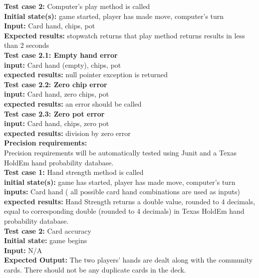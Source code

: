\documentclass[12pt]{article}
\begin{document}
	\noindent \textbf{Test case 2:} Computer’s play method is called\\
	\textbf{Initial state(s):} game started, player has made move, computer's turn\\
	\textbf{Input:} Card hand, chips, pot\\
	\textbf{Expected results:} stopwatch returns that play method returns results in less than 2 seconds\\

	\noindent \textbf{Test case 2.1: Empty hand error}\\
	\textbf{input:} Card hand (empty), chips, pot\\
	\textbf{expected results:} null pointer exception is returned\\

	\noindent \textbf{Test case 2.2: Zero chip error}\\
	\textbf{input:} Card hand, zero chips, pot\\
	\textbf{expected results:} an error should be called\\

	\noindent \textbf{Test case 2.3: Zero pot error}\\
	\textbf{input:} Card hand, chips, zero pot\\
	\textbf{expected results:} division by zero error\\

	\noindent \textbf{Precision requirements:}\\
    Precision requirements will be automatically tested using Junit and a Texas HoldEm hand 
            probability database.\\

    \noindent \textbf{Test case 1:} Hand strength method is called\\
    \textbf{initial state(s):} game has started, player has made move, computer’s turn\\
    \textbf{inputs:} Card hand ( all possible card hand combinations are used as inputs)\\
    \textbf{expected results:} Hand Strength returns a double value, rounded to 4 decimals, equal
    to corresponding double (rounded to 4 decimals) in Texas HoldEm hand probability
    database.\\
    
    \noindent \textbf{Test case 2:} Card accuracy \\
    \textbf{Initial state:} game begins\\
    \textbf{Input:} N/A\\
    \textbf{Expected Output:} The two players’ hands are dealt along with the community cards. There should not be any duplicate cards in the deck. \\
\end{document}
